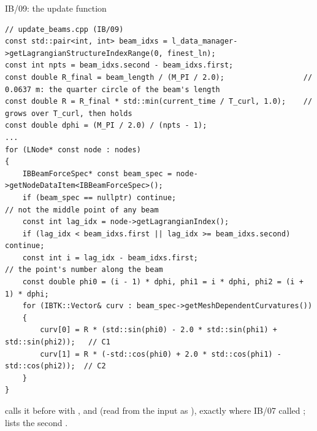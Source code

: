 \documentclass[aspectratio=169,11pt]{beamer}
\begin{document}
\begin{frame}[fragile]{IB/09: the update function}
\label{fr:curlcode}
\begin{lstlisting}[style=cpptiny]
// update_beams.cpp (IB/09)
const std::pair<int, int> beam_idxs = l_data_manager->getLagrangianStructureIndexRange(0, finest_ln);
const int npts = beam_idxs.second - beam_idxs.first;
const double R_final = beam_length / (M_PI / 2.0);                  // 0.0637 m: the quarter circle of the beam's length
const double R = R_final * std::min(current_time / T_curl, 1.0);    // grows over T_curl, then holds
const double dphi = (M_PI / 2.0) / (npts - 1);
...
for (LNode* const node : nodes)
{
    IBBeamForceSpec* const beam_spec = node->getNodeDataItem<IBBeamForceSpec>();
    if (beam_spec == nullptr) continue;                               // not the middle point of any beam
    const int lag_idx = node->getLagrangianIndex();
    if (lag_idx < beam_idxs.first || lag_idx >= beam_idxs.second) continue;
    const int i = lag_idx - beam_idxs.first;                          // the point's number along the beam
    const double phi0 = (i - 1) * dphi, phi1 = i * dphi, phi2 = (i + 1) * dphi;
    for (IBTK::Vector& curv : beam_spec->getMeshDependentCurvatures())
    {
        curv[0] = R * (std::sin(phi0) - 2.0 * std::sin(phi1) + std::sin(phi2));   // C1
        curv[1] = R * (-std::cos(phi0) + 2.0 * std::cos(phi1) - std::cos(phi2));  // C2
    }
}
\end{lstlisting}
\footnotesize {} calls it before  with ,  and  (read from the input as ), exactly where IB/07 called ;  lists the second .
\end{frame}
\end{document}
